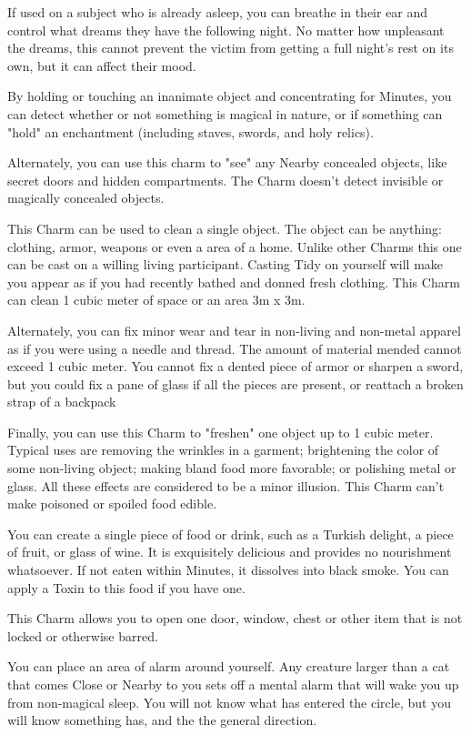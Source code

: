   If used on a subject who is already asleep, you can breathe in their ear and control what dreams they have the following night. No matter how unpleasant the dreams, this cannot prevent the victim from getting a full night’s rest on its own, but it can affect their mood.


  By holding or touching an inanimate object and concentrating for Minutes, you can detect whether or not something is magical in nature, or if something can "hold" an enchantment (including staves, swords, and holy relics).  

  Alternately, you can use this charm to "see" any Nearby concealed objects, like secret doors and hidden compartments.  The Charm doesn't detect invisible or magically concealed objects. 



  This Charm can be used to clean a single object. The object can be anything: clothing, armor, weapons or even a area of a home. Unlike other Charms this one can be cast on a willing living participant. Casting Tidy on yourself will make you appear as if you had recently bathed and donned fresh clothing. This Charm can clean 1 cubic meter of space or an area 3m x 3m. 

  Alternately, you can fix minor wear and tear in non-living and non-metal apparel as if you were using a needle and thread.  The amount of material mended cannot exceed 1 cubic meter.  You cannot fix a dented piece of armor or sharpen a sword, but you could fix a pane of glass if all the pieces are present, or reattach a broken strap of a backpack

  Finally, you can use this Charm to "freshen" one object up to 1 cubic meter. Typical uses are removing the wrinkles in a garment; brightening the color of some non-living object; making bland food more favorable; or polishing metal or glass. All these effects are considered to be a minor illusion. This Charm can't make poisoned or spoiled food edible. 


  You can create a single piece of food or drink, such as a Turkish delight, a piece of fruit, or glass of wine. It is exquisitely delicious and provides no nourishment whatsoever. If not eaten within Minutes, it dissolves into black smoke.  You can apply a Toxin to this food if you have one.

  \cbreak


  This Charm allows you to open one door, window, chest or other item that is not locked or otherwise barred. 


  You can place an area of alarm around yourself.  Any creature larger than a cat that comes Close or Nearby to you sets off a mental alarm that will wake you up from non-magical sleep.  You will not know what has entered the circle, but you will know something has, and the the general direction.


